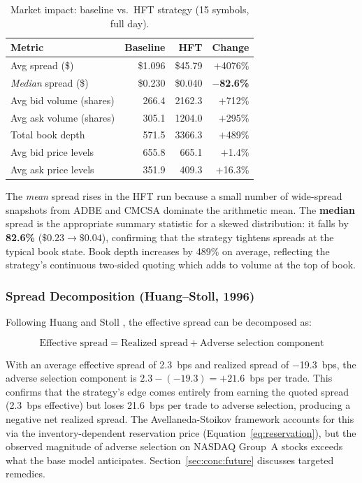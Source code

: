 \documentclass[12pt]{article}
\begin{document}
\begin{table}[H]
\centering
\small
\caption{Market impact: baseline vs.\ HFT strategy (15 symbols, full day).}
\label{tab:impact}
\begin{tabular}{@{}lrrr@{}}
\toprule
\textbf{Metric} & \textbf{Baseline} & \textbf{HFT} & \textbf{Change} \\
\midrule
Avg spread (\$)         & \$1.096 & \$45.79  & $+$4076\% \\
\textit{Median} spread (\$) & \$0.230 & \$0.040 & \textbf{$-$82.6\%} \\
Avg bid volume (shares) &   266.4 & 2162.3  & $+$712\% \\
Avg ask volume (shares) &   305.1 & 1204.0  & $+$295\% \\
Total book depth        &   571.5 & 3366.3  & $+$489\% \\
Avg bid price levels    &   655.8 &  665.1  & $+$1.4\% \\
Avg ask price levels    &   351.9 &  409.3  & $+$16.3\% \\
\bottomrule
\end{tabular}
\end{table}

The \textit{mean} spread rises in the HFT run because a small number of
wide-spread snapshots from ADBE and CMCSA dominate the arithmetic mean.
The \textbf{median} spread is the appropriate summary statistic for a
skewed distribution: it falls by \textbf{82.6\%} ($\$0.23 \to \$0.04$),
confirming that the strategy tightens spreads at the typical book state.
Book depth increases by 489\% on average, reflecting the strategy's
continuous two-sided quoting which adds to volume at the top of book.

\subsubsection*{Spread Decomposition (Huang--Stoll, 1996)}

Following Huang and Stoll \cite{huang1996}, the effective
spread can be decomposed as:

\[
\text{Effective spread} = \text{Realized spread} + \text{Adverse selection component}
\]

With an average effective spread of 2.3~bps and realized spread of
$-$19.3~bps, the adverse selection component is
$2.3 - (-19.3) = +21.6$~bps per trade. This confirms that the
strategy's edge comes entirely from earning the quoted spread (2.3~bps
effective) but loses 21.6~bps per trade to adverse selection, producing
a negative net realized spread. The Avellaneda-Stoikov framework
accounts for this via the inventory-dependent reservation price
(Equation~\ref{eq:reservation}), but the observed magnitude of adverse
selection on NASDAQ Group~A stocks exceeds what the base model
anticipates. Section~\ref{sec:conc:future} discusses targeted remedies.
\end{document}
